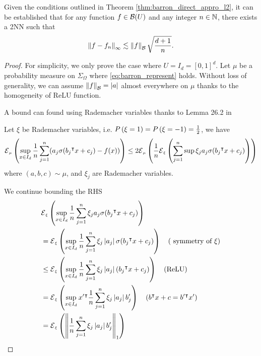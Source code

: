 
\begin{theorem}
    Given the conditions outlined in Theorem \ref{thm:barron_direct_appro_l2},
    it can be established that for any function $f \in \mathcal{B}(U)$ and any
    integer $n \in \mathbb{N}$, there exists a 2NN such that
    \begin{equation}
        \left\| f - f_n \right\|_{\infty} \lesssim 
        \left\| f \right\|_{\mathcal{B}} \sqrt{\frac{d+1}{n}}.
    \end{equation}
\end{theorem}

\begin{proof}
    For simplicity, we only prove the case where $U = I_d = [0,1]^d$. 
    Let $\mu$ be a probability measure on $\Sigma_{\Omega}$ where
    \eqref{eq:barron_represent} holds. Without loss of generality, we can assume
    $\left\| f \right\|_{\mathcal{B}} = \left| a \right|$ almost everywhere on $\mu$ thanks to the
    homogeneity of ReLU function.

    A bound can found using Rademacher variables thanks to Lemma 26.2 in \cite[
    p. 376]{shalev-shwartzUnderstandingMachineLearning2014}

    Let $\xi$ be Rademacher variables, i.e. $\PR{\xi=1} = \PR{\xi=-1} =
    \frac{1}{2}$, we have
    \begin{equation}
        \label{eq:proof_l_infty_fouier_1}
        \ERWi{\mu}{\sup_{x\in I_d} 
        \frac{1}{n} \sum_{j=1}^n (a_j\sigma(b_j\tr x + c_j) - f(x))}
        \leq 
        2 \ERWi{\mu}{
            \frac{1}{n} 
            \ERWi{\xi}{
                \sum_{j=1}^n \sup \xi_j a_j\sigma(b_j\tr x + c_j)
            }
        }
    \end{equation}
    where $(a,b,c)\sim\mu$, and $\xi_j$ are Rademacher variables.

    We continue bounding the RHS
    \begin{align}
        &\ERWi{\xi}{
            \sup_{x\in I_d} \frac{1}{n}\sum_{j=1}^{n} \xi_j a_j\sigma(b_j\tr x + c_j)
        } \\
        &= \ERWi{\xi}{
            \sup_{x\in I_d} \frac{1}{n}\sum_{j=1}^{n} \xi_j \abs{a_j} \sigma(b_j\tr x + c_j)
        } \quad
        (\text{ symmetry of $\xi$}) \\
        &\leq \ERWi{\xi}{
            \sup_{x\in I_d} \frac{1}{n}\sum_{j=1}^{n} \xi_j \abs{a_j}(b_j\tr x + c_j)
        } \quad 
        (\text{ReLU}) \\
        &= \ERWi{\xi}{
            \sup_{x\in I_d} x'\tr \frac{1}{n}\sum_{j=1}^{n} \xi_j \abs{a_j}b_j'
        }
        \quad (b\tr x + c = b'\tr x') \\
        &= \ERWi{\xi}{\norm{
            \frac{1}{n} \sum_{j=1}^{n}\xi_j\abs{a_j}b_j'}_1
        }
    \end{align}


\end{proof}
